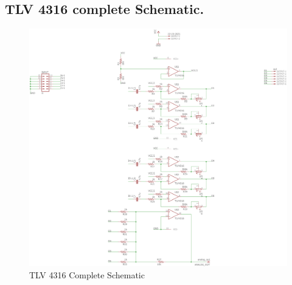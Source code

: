 \begin{annexesenv}
\chapter{TLV 4316 complete Schematic.}

\begin{figure}[!htpb]
\centering
\caption{TLV 4316 Complete Schematic}
\label{TLV_Complete}
\includegraphics[scale=0.7]{images/TLVsch}
\end{figure}

\end{annexesenv}
